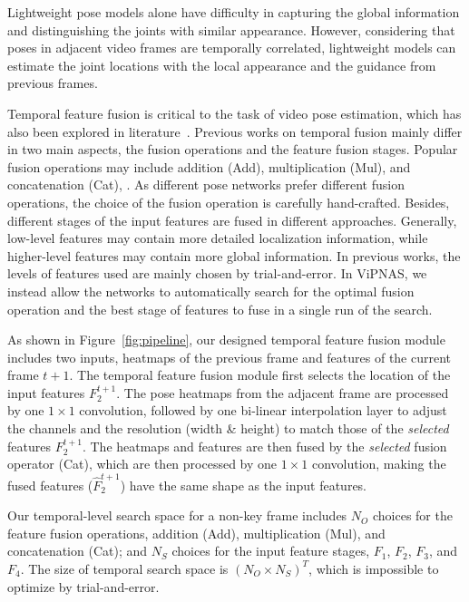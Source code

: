 \documentclass[final]{cvpr}
\begin{document}
Lightweight pose models alone have difficulty in capturing the global information and distinguishing the joints with similar appearance. However, considering that poses in adjacent video frames are temporally correlated, lightweight models can estimate the joint locations with the local appearance and the guidance from previous frames. 

Temporal feature fusion is critical to the task of video pose estimation, which has also been explored in literature~\cite{gkioxari2016chained,lihh2019temporal,liwt2019temporal,luo2018lstm,nie2019dynamic}. Previous works on temporal fusion mainly differ in two main aspects, \ie the fusion operations and the feature fusion stages. Popular fusion operations may include addition (Add), multiplication (Mul), and concatenation (Cat), \etc. As different pose networks prefer different fusion operations, the choice of the fusion operation is carefully hand-crafted. Besides, different stages of the input features are fused in different approaches. Generally, low-level features may contain more detailed localization information, while higher-level features may contain more global information. In previous works, the levels of features used are mainly chosen by trial-and-error. In ViPNAS, we instead allow the networks to automatically search for the optimal fusion operation and the best stage of features to fuse in a single run of the search. 

As shown in Figure~\ref{fig:pipeline}, our designed temporal feature fusion module includes two inputs, \ie heatmaps of the previous frame and features of the current frame $t+1$. The temporal feature fusion module first selects the location of the input features $F_2^{t+1}$. The pose heatmaps from the adjacent frame are processed by one $1 \times 1$ convolution, followed by one bi-linear interpolation layer to adjust the channels and the resolution (width \& height) to match those of the \emph{selected} features $F_2^{t+1}$. The heatmaps and features are then fused by the \emph{selected} fusion operator (Cat), which are then processed by one $1 \times 1$ convolution, making the fused features ($\hat{F}_2^{t+1}$) have the same shape as the input features. 

Our temporal-level search space for a non-key frame includes $N_O$ choices for the feature fusion operations, \eg addition (Add), multiplication (Mul), and concatenation (Cat); and $N_S$ choices for the input feature stages, \eg $F_1$, $F_2$, $F_3$, and $F_4$. The size of temporal search space is $(N_O \times N_S)^T$, which is impossible to optimize by trial-and-error.
\end{document}
